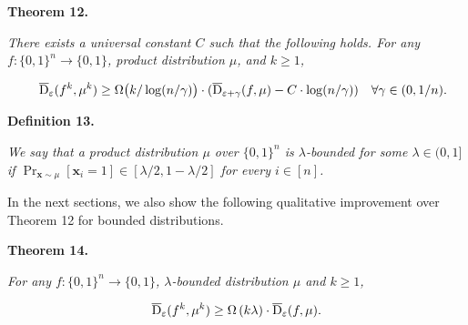 \documentclass[10pt,a4paper]{article}
\begin{document}


\par\medskip\noindent\textbf{
\textbf{Theorem 12}\textbf{.}
}\par



\emph{There exists a universal constant $C$ such that the following holds.
For any $f\colon\{0,1\}^{n}\to\{0,1\}$, product distribution $\mu$, and $k\geq 1$,}\par


\[\begin{gathered}
\quad\overline{{\textup{D}}}_{\varepsilon}(f^{k},\mu^{k})\geq\Omega\big{(}k/\log(n/\gamma)\big{)}\cdot(\overline{{\textup{D}}}_{\varepsilon+\gamma}(f,\mu)-C\cdot\log(n/\gamma))\quad\forall\gamma\in(0,1/n).
\end{gathered}\]







\par\medskip\noindent\textbf{
\textbf{Definition 13}\textbf{.}
}\par



\emph{We say that a product distribution $\mu$ over $\{0,1\}^{n}$ is $\lambda$-bounded for some $\lambda\in(0,1]$ if $\Pr_{\bm{x}\sim\mu}[\bm{x}_{i}=1]\in[\lambda/2,1-\lambda/2]$ for every $i\in[n]$.}\par






In the next sections, we also show the following qualitative improvement over Theorem 12 for bounded distributions.\par





\par\medskip\noindent\textbf{
\textbf{Theorem 14}\textbf{.}
}\par



\emph{For any $f\colon\{0,1\}^{n}\to\{0,1\}$, $\lambda$-bounded distribution $\mu$ and $k\geq 1$,}\par


\[\begin{gathered}
\overline{{\textup{D}}}_{\varepsilon}(f^{k},\mu^{k})\geq\Omega\left(k\lambda\right)\cdot\overline{{\textup{D}}}_{\varepsilon}(f,\mu).
\end{gathered}\]
\end{document}
